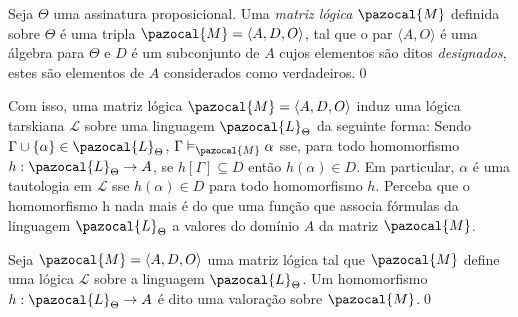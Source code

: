         \begin{definicao}
            Seja $\Theta$ uma assinatura proposicional. Uma \textit{matriz lógica} $\pazocal{M}$ definida sobre $\Theta$ é uma tripla $\pazocal{M} = \langle A, D, O \rangle$, tal que o par $\langle A, O \rangle$ é uma álgebra para $\Theta$ e $D$ é um subconjunto de $A$ cujos elementos são ditos \textit{designados}, estes são elementos de $A$ considerados como verdadeiros.\qed{}
        \end{definicao}

        Com isso, uma matriz lógica $\pazocal{M} = \langle A, D, O \rangle$ induz uma lógica tarskiana $\mathcal{L}$ sobre uma linguagem $\pazocal{L}_{\Theta}$ da seguinte forma: Sendo $\Gamma \cup \{\alpha\} \in \pazocal{L}_{\Theta}$, $\Gamma \vDash_{\pazocal{M}} \alpha$ sse, para todo homomorfismo $h : \pazocal{L}_{\Theta} \rightarrow A$, se $h[\Gamma] \subseteq D$ então $h(\alpha) \in D$. Em particular, $\alpha$ é uma tautologia em $\mathcal{L}$ sse $h(\alpha) \in D$ para todo homomorfismo $h$. Perceba que o homomorfismo h nada mais é do que uma função que associa fórmulas da linguagem $\pazocal{L}_{\Theta}$ a valores do domínio $A$ da matriz $\pazocal{M}$.

        \begin{definicao}[Valoração]
            Seja $\pazocal{M} = \langle A, D, O \rangle$ uma matriz lógica tal que $\pazocal{M}$ define uma lógica $\mathcal{L}$ sobre a linguagem $\pazocal{L}_{\Theta}$. Um homomorfismo $h : \pazocal{L}_{\Theta} \rightarrow A$ é dito uma valoração sobre $\pazocal{M}$.\qed{}
        \end{definicao}



